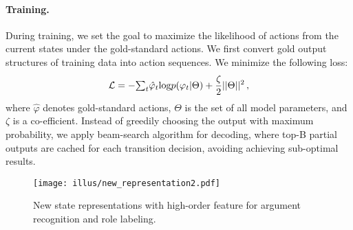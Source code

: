 \documentclass[letterpaper]{article} %
\begin{document}
\begin{CJK}{UTF8}{gbsn}
\paragraph{Training.}
During training, we set the goal to maximize the likelihood of actions from the current states under the gold-standard actions.
We first convert gold output structures of training data into action sequences.
We minimize the following loss:
\begin{equation}
\setlength\abovedisplayskip{2pt}
\setlength\belowdisplayskip{2pt}
 \mathcal{L} = - \begin{matrix}\sum_{t} \end{matrix} \hat{\varphi}_t \text{log} p(\varphi_t | \Theta ) +  \frac{\zeta}{2}
 ||\Theta||^{2} \,,
\end{equation}
where $\hat{\varphi}$ denotes gold-standard actions,
$\Theta$ is the set of all model parameters,
and $\zeta$ is a co-efficient.
Instead of greedily choosing the output with maximum probability, we apply beam-search algorithm \cite{zhang-clark-2008-tale,LyuZJ16} for decoding, where top-B partial outputs are cached for each transition decision, avoiding achieving sub-optimal results.









\begin{figure}[!t]
\centering
\texttt{[image: illus/new\_representation2.pdf]}
\caption{
New state representations with high-order feature for argument recognition and role labeling.
}
\label{new-state}
\end{figure}







\end{CJK}
\end{document}
